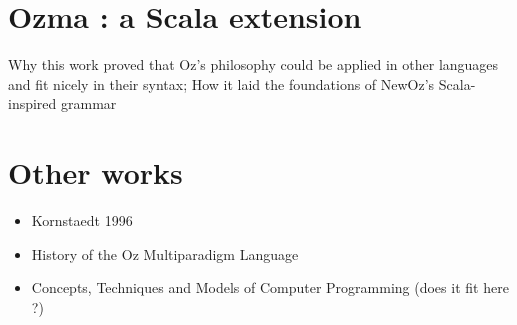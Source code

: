 \section{Ozma : a Scala extension}\label{sec:ch1Ozma}
Why this work proved that Oz's philosophy could be applied in other languages and fit nicely in their syntax;
How it laid the foundations of NewOz's Scala-inspired grammar

\section{Other works}\label{sec:ch1OtherWorks}
\begin{itemize}
    \item Kornstaedt 1996
    \item History of the Oz Multiparadigm Language
    \item Concepts, Techniques and Models of Computer Programming (does it fit here ?)
\end{itemize}